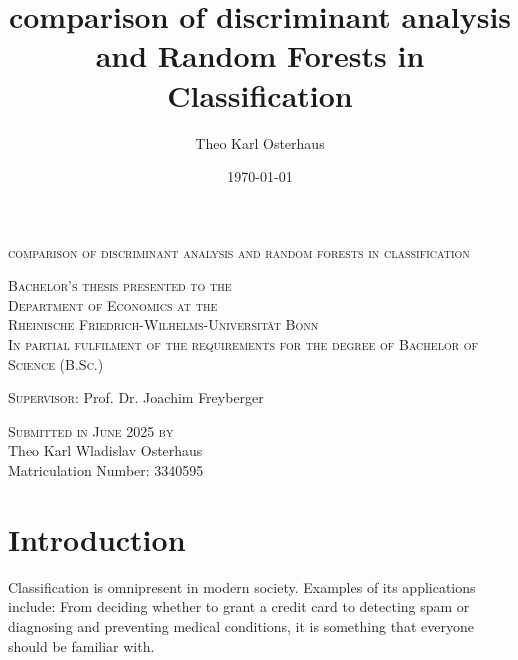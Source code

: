\documentclass[12pt,a4paper,titlepage]{article}
\title{comparison of discriminant analysis and Random Forests in Classification}
\author{Theo Karl Osterhaus }
\date{\today}
\numberwithin{equation}{section}
\numberwithin{table}{section}
\numberwithin{figure}{section}
\begin{document}
\begin{titlepage}
		\begin{center}
		\par
		\vspace*{2cm}
		{\LARGE \textsc{comparison of discriminant analysis and random forests in classification}}
		\par
		\vspace{4.5cm}
		\par
		{\textsc{Bachelor's thesis presented to the}}\\
		{\textsc{Department of Economics at the}}\\
		{\textsc{Rheinische Friedrich-Wilhelms-Universität Bonn}}\\
            \vspace*{1cm}
		{\textsc{In partial fulfilment of the requirements for  the degree of}}
            {\textsc{Bachelor of Science (B.Sc.)}}
		\par
		\vspace{5.25cm}
		{\textsc{Supervisor:} Prof. Dr. Joachim Freyberger}\\
		\vspace{0.5cm}
		\par
		\vspace{1cm}
		{\textsc{Submitted in June 2025 by} \\ Theo Karl Wladislav Osterhaus \\ Matriculation Number: 3340595}\\
		\end{center}
\end{titlepage}
	
\thispagestyle{empty}

\newpage
\tableofcontents
\newpage
\listoffigures
{}
\newpage
\listoftables
{}

\newpage
\cleardoublepage

\newpage
\section{Introduction}\label{Introduction}
Classification is omnipresent in modern society. Examples of its applications include:
From deciding whether to grant a credit card to detecting spam or diagnosing and preventing medical conditions, it is something that everyone should be familiar with.
\end{document}
